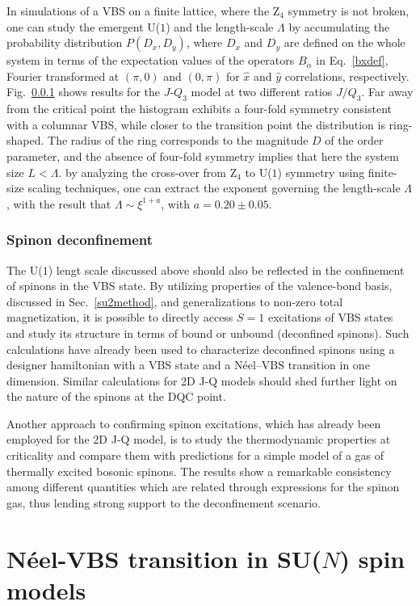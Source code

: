 \documentclass[range]{ar2e}
\begin{document}
In simulations of a VBS on a finite lattice, where the Z$_4$ symmetry is not broken, one can study the emergent U($1$) and the length-scale
$\Lambda$ by accumulating the probability distribution $P(D_x,D_y)$, where $D_x$ and $D_y$ are defined on the whole system in terms of the expectation
values of the operators $B_\alpha$ in Eq.~\ref{bxdef}, Fourier transformed at $(\pi,0)$ and $(0,\pi)$ for $\hat x$ and $\hat y$ correlations, respectively.
Fig.~\ref{} shows results for the $J$-$Q_3$ model at two different ratios $J/Q_3$. Far away from the critical point the histogram exhibits a four-fold
symmetry consistent with a columnar VBS, while closer to the transition point the distribution is ring-shaped. The radius of the ring corresponds
to the magnitude $D$ of the order parameter, and the absence of four-fold symmetry implies that here the system size $L < \Lambda$. by analyzing the
cross-over from Z$_4$ to U($1$) symmetry using finite-size scaling techniques, one can extract the exponent governing the length-scale $\Lambda$, with 
the result that $\Lambda \sim \xi^{1+a}$, with $a=0.20 \pm 0.05$.

\subsubsection{Spinon deconfinement}

The U($1$) lengt scale discussed above should also be reflected in the confinement of spinons in the VBS state. By utilizing properties of the
valence-bond basis, discussed in Sec.~\ref{su2method}, and generalizations to non-zero total magnetization, it is possible to directly access $S=1$ excitations
of VBS states and study its structure in terms of bound or unbound (deconfined spinons). Such calculations have already been used to characterize deconfined
spinons using a designer hamiltonian with a VBS state and a N\'eel--VBS transition in one dimension. Similar calculations for 2D J-Q models should shed
further light on the nature of the spinons at the DQC point.

Another approach to confirming spinon excitations, which has already been employed for the 2D J-Q model, is to study the thermodynamic properties at 
criticality and compare them with predictions for a simple model of a gas of thermally excited bosonic spinons. The results show a remarkable consistency 
among different quantities which are related through expressions for the spinon gas, thus lending strong support to the deconfinement scenario.

\section{N\'eel-VBS transition in SU($N$) spin models}
\label{sec:sunmodels}
\end{document}
